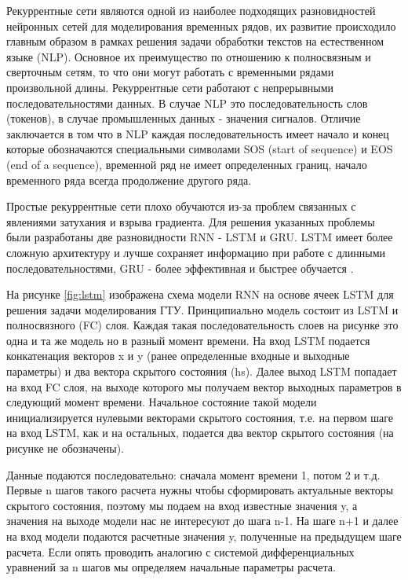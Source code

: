 \documentclass[12pt,a4paper]{article}
\begin{document}
%


Рекуррентные сети являются одной из наиболее подходящих разновидностей нейронных сетей для моделирования временных рядов, их развитие происходило главным образом в рамках решения задачи обработки текстов на естественном языке (NLP). Основное их преимущество по отношению к полносвязным и сверточным сетям, то что они могут работать с временными рядами произвольной длины. Рекуррентные сети работают с непрерывными последовательностями данных. В случае NLP это  последовательность слов (токенов), в случае промышленных данных - значения сигналов. Отличие заключается в том что в NLP каждая последовательность имеет начало и конец которые обозначаются специальными символами SOS (start of sequence) и EOS (end of a sequence), временной ряд не имеет определенных границ, начало временного ряда всегда продолжение другого ряда.

Простые рекуррентные сети плохо обучаются из-за проблем связанных с явлениями затухания и взрыва градиента. Для решения указанных проблемы были разработаны две разновидности RNN - LSTM и GRU. LSTM имеет более сложную архитектуру и лучше сохраняет информацию при работе с длинными последовательностями, GRU - более эффективная и быстрее обучается \cite{habr_lstm_gru}.

На рисунке \ref{fig:lstm} изображена схема модели RNN на основе ячеек LSTM для решения задачи моделирования ГТУ. Принципиально модель состоит из LSTM и полносвязного (FC) слоя. Каждая такая последовательность слоев на рисунке это одна и та же модель но в разный момент времени. На вход LSTM подается конкатенация векторов x и y (ранее определенные входные и выходные параметры) и два вектора скрытого состояния (hs). Далее выход LSTM попадает на вход FC слоя, на выходе которого мы получаем вектор выходных параметров в следующий момент времени. Начальное состояние такой модели инициализируется нулевыми векторами скрытого состояния, т.е. на первом шаге на вход LSTM, как и на остальных, подается два вектор скрытого состояния (на рисунке не обозначены).

Данные подаются последовательно: сначала момент времени 1, потом 2 и т.д. Первые n шагов такого расчета нужны чтобы сформировать актуальные векторы скрытого состояния, поэтому мы подаем на вход известные значения y, а значения на выходе модели нас не интересуют до шага n-1. На шаге n+1 и далее на вход модели подаются расчетные значения y, полученные на предыдущем шаге расчета. Если опять проводить аналогию с системой дифференциальных уравнений за n шагов мы определяем начальные параметры расчета.
\end{document}
